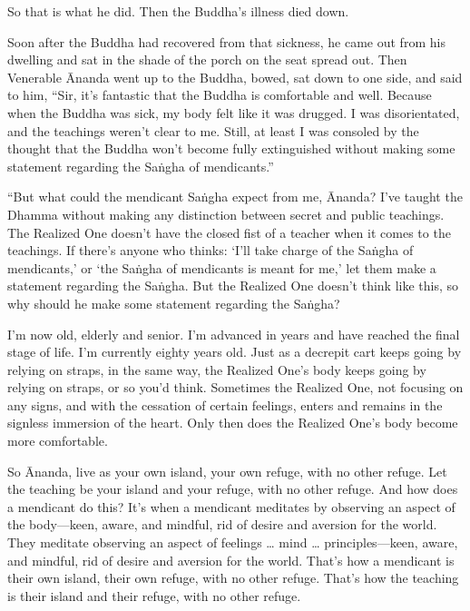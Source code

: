 \documentclass[12pt,openany]{book}%
\begin{document}
So that is what he did. Then the Buddha’s illness died down. 

Soon after the Buddha had recovered from that sickness, he came out from his dwelling and sat in the shade of the porch on the seat spread out. Then Venerable Ānanda went up to the Buddha, bowed, sat down to one side, and said to him, “Sir, it’s fantastic that the Buddha is comfortable and well. Because when the Buddha was sick, my body felt like it was drugged. I was disorientated, and the teachings weren’t clear to me. Still, at least I was consoled by the thought that the Buddha won’t become fully extinguished without making some statement regarding the \textsanskrit{Saṅgha} of mendicants.” 

“But what could the mendicant \textsanskrit{Saṅgha} expect from me, Ānanda? I’ve taught the Dhamma without making any distinction between secret and public teachings. The Realized One doesn’t have the closed fist of a teacher when it comes to the teachings. If there’s anyone who thinks: ‘I’ll take charge of the \textsanskrit{Saṅgha} of mendicants,’ or ‘the \textsanskrit{Saṅgha} of mendicants is meant for me,’ let them make a statement regarding the \textsanskrit{Saṅgha}. But the Realized One doesn’t think like this, so why should he make some statement regarding the \textsanskrit{Saṅgha}? 

I’m now old, elderly and senior. I’m advanced in years and have reached the final stage of life. I’m currently eighty years old. Just as a decrepit cart keeps going by relying on straps, in the same way, the Realized One’s body keeps going by relying on straps, or so you’d think. Sometimes the Realized One, not focusing on any signs, and with the cessation of certain feelings, enters and remains in the signless immersion of the heart. Only then does the Realized One’s body become more comfortable. 

So Ānanda, live as your own island, your own refuge, with no other refuge. Let the teaching be your island and your refuge, with no other refuge. And how does a mendicant do this? It’s when a mendicant meditates by observing an aspect of the body—keen, aware, and mindful, rid of desire and aversion for the world. They meditate observing an aspect of feelings … mind … principles—keen, aware, and mindful, rid of desire and aversion for the world. That’s how a mendicant is their own island, their own refuge, with no other refuge. That’s how the teaching is their island and their refuge, with no other refuge. 
\end{document}
